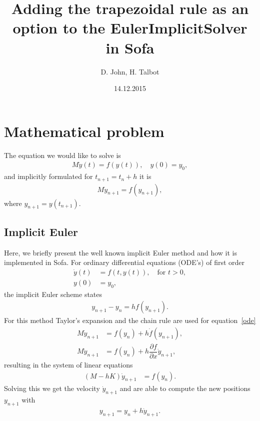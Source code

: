 \documentclass[a4paper,11pt]{article}
\title{\textbf{Adding the trapezoidal rule as an option to the EulerImplicitSolver in Sofa}}
\author{D. John, H. Talbot}
\date{14.12.2015}
\begin{document}
\maketitle

\section{Mathematical problem}
The equation we would like to solve is
\begin{align} 
M \dot{y}(t) = f(y(t)),\quad  y(0) = y_0, 
\end{align}
and implicitly formulated for $t_{n+1} = t_{n} + h $ it is 
\begin{align} \label{ode}
M \dot{y}_{n+1} = f(y_{n+1}),
\end{align}
where $y_{n+1} = y(t_{n+1})$.



\subsection*{Implicit Euler}
Here, we briefly present the well known implicit Euler method and how it is implemented in Sofa.
For ordinary differential equations (ODE's) of first order 
\begin{align*}
\dot{y}(t) &= f (t,y(t)), \quad \text{for } t>0,\\
y(0) &= y_0,
\end{align*}
the implicit Euler scheme states 
\begin{align}
y_{n+1} - y_{n} = h f(y_{n+1}).
\end{align}
For this method Taylor's expansion and the chain rule are used for equation~\eqref{ode}
\begin{align*}
M \dot{y}_{n+1} &= f(y_{n}) + h \dot{f}(y_{n+1}), \\
M \dot{y}_{n+1} &= f(y_{n}) + h \dfrac{\partial f}{\partial x} \dot{y}_{n+1},
\end{align*}
resulting in the system of linear equations
\begin{align*}
\left( M -h K \right) \dot{y}_{n+1} &= f(y_{n}).
\end{align*}
Solving this we get the velocity $\dot{y}_{n+1}$ and are able to compute the new positions $y_{n+1}$ with
\begin{align*}
y_{n+1} = y_{n} + h \dot{y}_{n+1}.
\end{align*}
\end{document}
